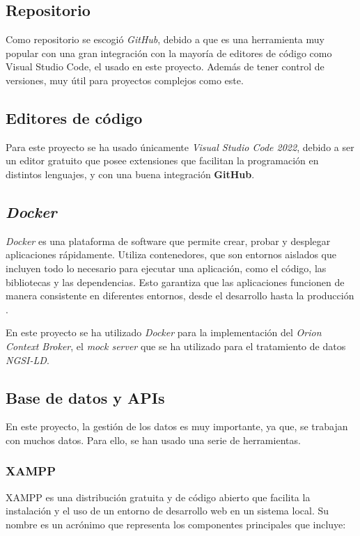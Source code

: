 \subsection{Repositorio}
Como repositorio se escogió \textit{GitHub}, debido a que es una herramienta muy popular con una gran integración con la mayoría de editores de código como Visual Studio Code, el usado en este proyecto. Además de tener control de versiones, muy útil para proyectos complejos como este.


\subsection{Editores de código}

Para este proyecto se ha usado únicamente \textit{Visual Studio Code 2022}, debido a ser un editor gratuito que posee extensiones que facilitan la programación en distintos lenguajes, y con una buena integración \textbf{GitHub}.

\subsection{\textit{Docker}}\label{docker}
\textit{Docker} es una plataforma de software que permite crear, probar y desplegar aplicaciones rápidamente. Utiliza contenedores, que son entornos aislados que incluyen todo lo necesario para ejecutar una aplicación, como el código, las bibliotecas y las dependencias. Esto garantiza que las aplicaciones funcionen de manera consistente en diferentes entornos, desde el desarrollo hasta la producción \cite{Merkel2015, Docker2023}.

En este proyecto se ha utilizado \textit{Docker} para la implementación del \textit{Orion Context Broker}, el \textit{mock server} que se ha utilizado para el tratamiento de datos \textit{NGSI-LD}.

\subsection{Base de datos y APIs}

En este proyecto, la gestión de los datos es muy importante, ya que, se trabajan con muchos datos. Para ello, se han usado una serie de herramientas.

\subsubsection{XAMPP}
XAMPP es una distribución gratuita y de código abierto que facilita la instalación y el uso de un entorno de desarrollo web en un sistema local. Su nombre es un acrónimo que representa los componentes principales que incluye: 


